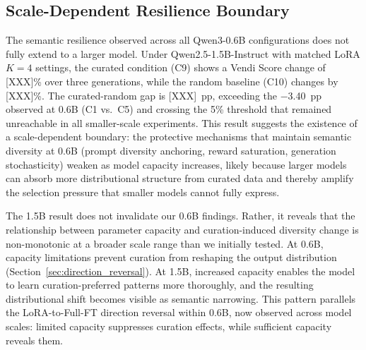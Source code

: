 

\subsection{Scale-Dependent Resilience Boundary}
\label{sec:scale_boundary}

The semantic resilience observed across all Qwen3-0.6B configurations does not fully extend to a larger model. Under Qwen2.5-1.5B-Instruct with matched LoRA $K{=}4$ settings, the curated condition (C9) shows a Vendi Score change of [XXX]\% over three generations, while the random baseline (C10) changes by [XXX]\%. The curated-random gap is [XXX]~pp, exceeding the $-$3.40~pp observed at 0.6B (C1 vs.\ C5) and crossing the 5\% threshold that remained unreachable in all smaller-scale experiments. This result suggests the existence of a scale-dependent boundary: the protective mechanisms that maintain semantic diversity at 0.6B (prompt diversity anchoring, reward saturation, generation stochasticity) weaken as model capacity increases, likely because larger models can absorb more distributional structure from curated data and thereby amplify the selection pressure that smaller models cannot fully express.

The 1.5B result does not invalidate our 0.6B findings. Rather, it reveals that the relationship between parameter capacity and curation-induced diversity change is non-monotonic at a broader scale range than we initially tested. At 0.6B, capacity limitations prevent curation from reshaping the output distribution (Section~\ref{sec:direction_reversal}). At 1.5B, increased capacity enables the model to learn curation-preferred patterns more thoroughly, and the resulting distributional shift becomes visible as semantic narrowing. This pattern parallels the LoRA-to-Full-FT direction reversal within 0.6B, now observed across model scales: limited capacity suppresses curation effects, while sufficient capacity reveals them.



